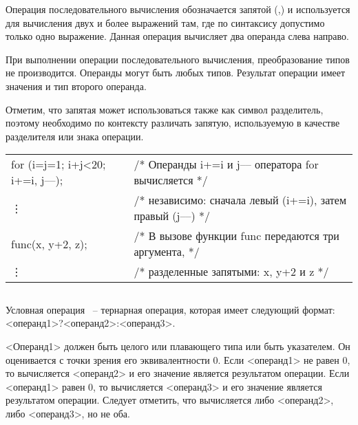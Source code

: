 Операция последовательного вычисления обозначается запятой (,) и используется для вычисления двух и более выражений там, где по синтаксису допустимо только одно выражение. Данная операция вычисляет два операнда слева направо. \killoverfullbefore

При выполнении операции последовательного вычисления, преобразование типов не производится. Операнды могут быть любых типов. Результат операции имеет значения и тип второго операнда. \killoverfullbefore

Отметим, что запятая может использоваться также как символ разделитель, поэтому необходимо по контексту различать запятую, используемую в качестве разделителя или знака операции. \killoverfullbefore \BL

\begin{pExample}
\begin{tabular}{ l l }
for (i=j=1; i+j<20; i+=i, j{--}{--}); & \textcolor{exComm}{/* Операнды i+=i и j{--}{--} оператора for вычисляется */} \\
\vdots & \textcolor{exComm}{/* независимо: сначала левый (i+=i), затем правый (j{--}{--}) */} \\
func(x, y+2, z); & \textcolor{exComm}{/* В вызове функции func передаются три аргумента,  */} \\
\vdots & \textcolor{exComm}{/* разделенные запятыми: x, y+2 и z */} \\
\end{tabular}
\end{pExample}

\subsection{}

Условная операция ~-- тернарная операция, которая имеет следующий формат: <операнд1>?<операнд2>:<операнд3>.\killoverfullbefore

<Операнд1> должен быть целого или плавающего типа или быть указателем. Он оценивается с точки зрения его эквивалентности 0. Если <операнд1> не равен 0, то вычисляется <операнд2> и его значение является результатом операции. Если <операнд1> равен 0, то вычисляется <операнд3> и его значение является результатом операции. Следует отметить, что вычисляется либо <операнд2>, либо <операнд3>, но не оба. \killoverfullbefore

